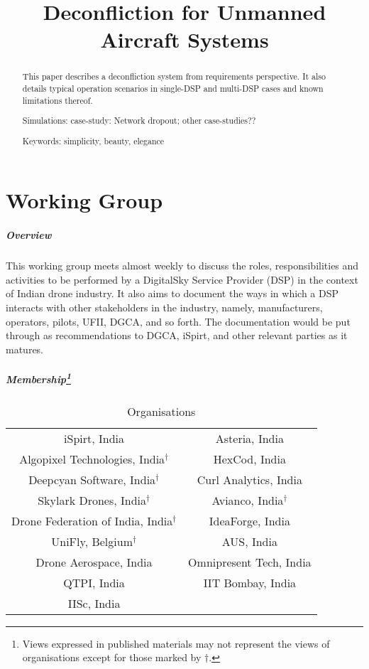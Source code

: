 \documentclass{ua_wgs_base}
\begin{document}
\title{Deconfliction for Unmanned Aircraft Systems}
\author{\printworkinggroup}

\maketitle
\begin{abstract}
This paper describes a deconfliction system from requirements perspective.
It also details typical operation scenarios in single-DSP and multi-DSP
cases and known limitations thereof.

Simulations: case-study: Network dropout; other case-studies??

Keywords: simplicity, beauty, elegance
\end{abstract}

\chapter*{Working Group}

\paragraph*{Overview }

This working group meets almost weekly to discuss the roles, responsibilities
and activities to be performed by a DigitalSky Service Provider (DSP)
in the context of Indian drone industry. It also aims to document
the ways in which a DSP interacts with other stakeholders in the industry,
namely, manufacturers, operators, pilots, UFII, DGCA, and so forth.
The documentation would be put through as recommendations to DGCA,
iSpirt, and other relevant parties as it matures.

\paragraph*{Membership\protect\footnote{Views expressed in published materials may not represent the views
of organisations except for those marked by $\dagger$.}}

\begin{table}[H]
\begin{centering}
\begin{tabular}{|c|c|}
\hline 
\textsf{iSpirt, India} & \textsf{Asteria, India}\tabularnewline
\textsf{Algopixel Technologies, India}$^{\dagger}$ & \textsf{HexCod, India}\tabularnewline
\textsf{Deepcyan Software, India}$^{\dagger}$ & \textsf{Curl Analytics, India}\tabularnewline
\textsf{Skylark Drones, India}$^{\dagger}$ & \textsf{Avianco, India}$^{\dagger}$\tabularnewline
\textsf{Drone Federation of India, India}$^{\dagger}$ & \textsf{IdeaForge, India}\tabularnewline
\textsf{UniFly, Belgium}$^{\dagger}$ & \textsf{AUS, India}\tabularnewline
\textsf{Drone Aerospace, India} & \textsf{Omnipresent Tech, India}\tabularnewline
\textsf{QTPI, India} & \textsf{IIT Bombay, India}\tabularnewline
\textsf{IISc, India} & \tabularnewline
\hline 
\end{tabular}
\par\end{centering}
\caption{Organisations}
\end{table}
\end{document}
